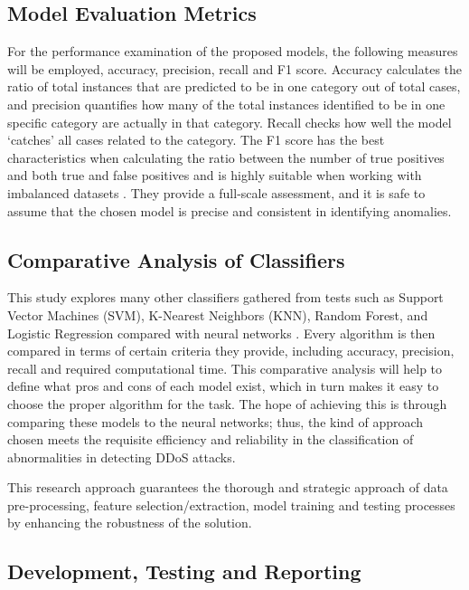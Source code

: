 \documentclass[a4paper, 12pt]{article}
\begin{document}
\subsection{ Model Evaluation Metrics }

For the performance examination of the proposed models, the following measures will be employed, accuracy, precision, recall and F1 score. Accuracy calculates the ratio of total instances that are predicted to be in one category out of total cases, and precision quantifies how many of the total instances identified to be in one specific category are actually in that category. Recall checks how well the model ‘catches’ all cases related to the category. The F1 score has the best characteristics when calculating the ratio between the number of true positives and both true and false positives and is highly suitable when working with imbalanced datasets . They provide a full-scale assessment, and it is safe to assume that the chosen model is precise and consistent in identifying anomalies.

\subsection{ Comparative Analysis of Classifiers }

This study explores many other classifiers gathered from tests such as Support Vector Machines (SVM), K-Nearest Neighbors (KNN), Random Forest, and Logistic Regression compared with neural networks . Every algorithm is then compared in terms of certain criteria they provide, including accuracy, precision, recall and required computational time. This comparative analysis will help to define what pros and cons of each model exist, which in turn makes it easy to choose the proper algorithm for the task. The hope of achieving this is through comparing these models to the neural networks; thus, the kind of approach chosen meets the requisite efficiency and reliability in the classification of abnormalities in detecting DDoS attacks.

This research approach guarantees the thorough and strategic approach of data pre-processing, feature selection/extraction, model training and testing processes by enhancing the robustness of the solution.

\subsection { Development, Testing and Reporting }
\end{document}
